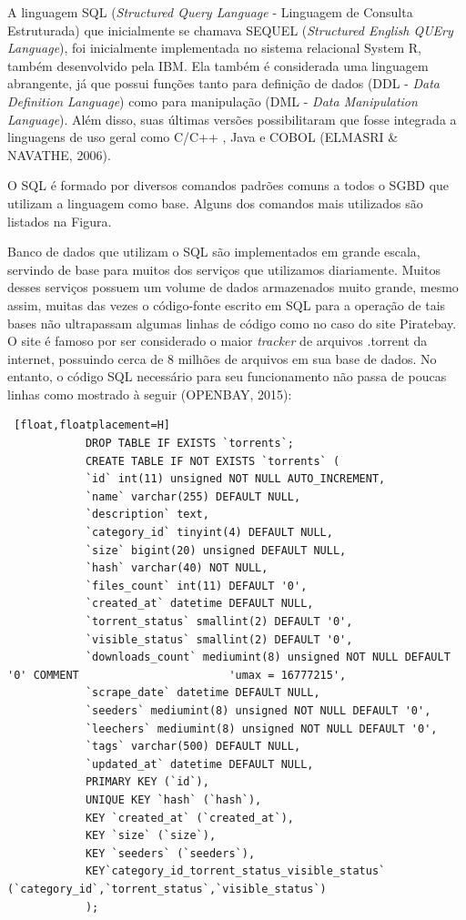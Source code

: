 		A linguagem SQL (\textit{Structured Query Language} - Linguagem de Consulta Estruturada) que inicialmente se chamava SEQUEL (\textit{Structured English QUEry Language}), foi inicialmente implementada no sistema relacional System R, também desenvolvido pela IBM. Ela também é considerada uma linguagem abrangente, já que possui funções tanto para definição de dados (DDL - \textit{Data Definition Language}) como para manipulação (DML - \textit{Data Manipulation Language}). Além disso, suas últimas versões possibilitaram que fosse integrada a linguagens de uso geral como C/C++ , Java e COBOL (ELMASRI \& NAVATHE, 2006)\cite{ELMASRI_NAVATHE}.
		
		O SQL é formado por diversos comandos padrões comuns a todos o SGBD que utilizam a linguagem como base. Alguns dos comandos mais utilizados são listados na Figura.
		
		Banco de dados que utilizam o SQL são implementados em grande escala, servindo de base para muitos dos serviços que utilizamos diariamente. Muitos desses serviços possuem um volume de dados armazenados muito grande, mesmo assim, muitas das vezes o código-fonte escrito em SQL para a operação de tais bases não ultrapassam algumas linhas de código como no caso do site Piratebay. O site é famoso por ser considerado o maior \textit{tracker} de arquivos .torrent da internet, possuindo cerca de 8 milhões de arquivos em sua base de dados. No entanto, o código SQL necessário para seu funcionamento não passa de poucas linhas como mostrado à seguir (OPENBAY, 2015)\cite{OPENBAY}:
		
		\newpage
		
		\begin{lstlisting} [float,floatplacement=H]
			DROP TABLE IF EXISTS `torrents`;
			CREATE TABLE IF NOT EXISTS `torrents` (
			`id` int(11) unsigned NOT NULL AUTO_INCREMENT,
			`name` varchar(255) DEFAULT NULL,
			`description` text,
			`category_id` tinyint(4) DEFAULT NULL,
			`size` bigint(20) unsigned DEFAULT NULL,
			`hash` varchar(40) NOT NULL,
			`files_count` int(11) DEFAULT '0',
			`created_at` datetime DEFAULT NULL,
			`torrent_status` smallint(2) DEFAULT '0',
			`visible_status` smallint(2) DEFAULT '0',
			`downloads_count` mediumint(8) unsigned NOT NULL DEFAULT '0' COMMENT                 	   'umax = 16777215',
			`scrape_date` datetime DEFAULT NULL,
			`seeders` mediumint(8) unsigned NOT NULL DEFAULT '0',
			`leechers` mediumint(8) unsigned NOT NULL DEFAULT '0',
			`tags` varchar(500) DEFAULT NULL,
			`updated_at` datetime DEFAULT NULL,
			PRIMARY KEY (`id`),
			UNIQUE KEY `hash` (`hash`),
			KEY `created_at` (`created_at`),
			KEY `size` (`size`),
			KEY `seeders` (`seeders`),
			KEY`category_id_torrent_status_visible_status`     	 (`category_id`,`torrent_status`,`visible_status`)
			);
		\end{lstlisting}
		
